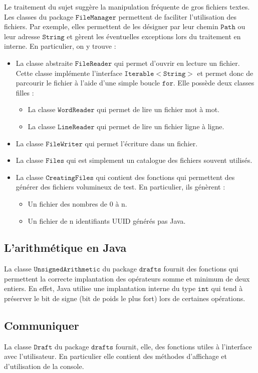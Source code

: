 \documentclass[12pt,a4paper,titlepage]{article}
\newcommand{\class}[1]{$\mathtt{#1}$}
\begin{document}
Le traitement du sujet suggère la manipulation fréquente de gros fichiers textes.\\
Les classes du package \class{FileManager} permettent de faciliter l'utilisation des fichiers. Par exemple, elles permettent de les désigner par leur chemin \class{Path} ou leur adresse \class{String} et gèrent les éventuelles exceptions lors du traitement en interne. En particulier, on y trouve :
\begin{itemize}
\item La classe abstraite \class{FileReader} qui permet d'ouvrir en lecture un fichier.\\
	Cette classe implémente l'interface \class{Iterable<String>} et permet donc de parcourir le fichier à l'aide d'une simple boucle \class{for}.
	Elle possède deux classes filles :
	\begin{itemize}
	\item La classe \class{WordReader} qui permet de lire un fichier mot à mot.
	\item La classe \class{LineReader} qui permet de lire un fichier ligne à ligne.
	\end{itemize}
\item La classe \class{FileWriter} qui permet l'écriture dans un fichier.
\item La classe \class{Files} qui est simplement un catalogue des fichiers souvent utilisés.
\item La classe \class{CreatingFiles} qui contient des fonctions qui permettent des générer des fichiers volumineux de test. En particulier, ils génèrent :
	\begin{itemize}
	\item Un fichier des nombres de 0 à n.
	\item Un fichier de n identifiants UUID générés pas Java.
	\end{itemize}
\end{itemize}

\subsection*{L'arithmétique en Java}
La classe \class{UnsignedArithmetic} du package \class{drafts} fournit des fonctions qui permettent la correcte implantation des opérateurs somme et minimum de deux entiers. En effet, Java utilise une implantation interne du type \class{int} qui tend à préserver le bit de signe (bit de poids le plus fort) lors de certaines opérations.

\subsection*{Communiquer}
La classe \class{Draft} du package \class{drafts} fournit, elle, des fonctions utiles à l'interface avec l'utilisateur. En particulier elle contient des méthodes d'affichage et d'utilisation de la console.
\end{document}
